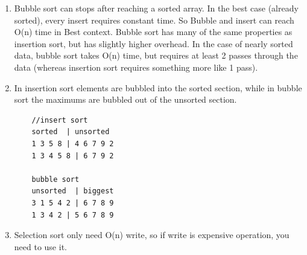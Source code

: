 \documentclass[a4paper,11pt,twoside]{book}
\begin{document}
\begin{enumerate}
\item Bubble sort can stops after reaching a sorted array. In the best case (already sorted), every insert requires constant time. So Bubble and insert can reach O(n) time in Best context. Bubble sort has many of the same properties as insertion sort, but has slightly higher overhead. In the case of nearly sorted data, bubble sort takes O(n) time, but requires at least 2 passes through the data (whereas insertion sort requires something more like 1 pass).


\item In insertion sort elements are bubbled into the sorted section, while in bubble sort the maximums are bubbled out of the unsorted section.

\begin{lstlisting}
	//insert sort
	sorted  | unsorted
	1 3 5 8 | 4 6 7 9 2
	1 3 4 5 8 | 6 7 9 2
	
	bubble sort
	unsorted  | biggest
	3 1 5 4 2 | 6 7 8 9
	1 3 4 2 | 5 6 7 8 9
\end{lstlisting}

\item Selection sort only need O(n) write, so if write is expensive operation, you need to use it. 
\end{enumerate}  
\end{document}
